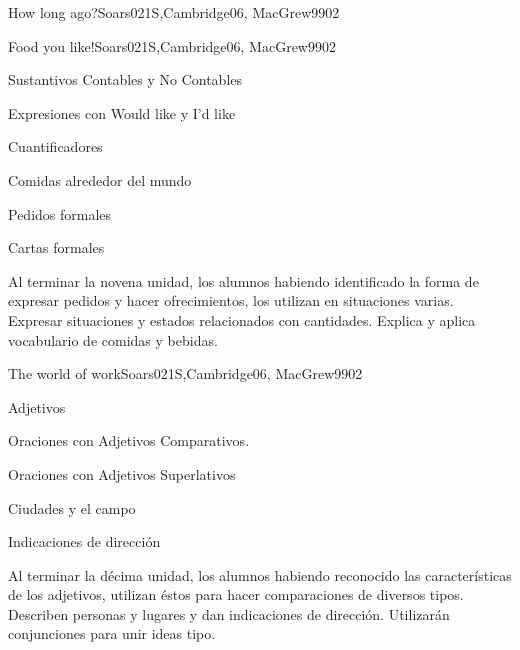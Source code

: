 \begin{syllabus}
\begin{unit}{How long ago?}{}{Soars021S,Cambridge06, MacGrew99}{0}{2}
\end{unit}
\begin{unit}{Food you like!}{}{Soars021S,Cambridge06, MacGrew99}{0}{2}
   \begin{topics}
      \item Sustantivos Contables y No Contables
      \item Expresiones con Would like y I'd like
      \item Cuantificadores
      \item Comidas alrededor del mundo
      \item Pedidos formales
      \item Cartas formales
   \end{topics}

   \begin{learningoutcomes}
      \item Al terminar la novena unidad, los alumnos habiendo identificado la forma de expresar pedidos y hacer ofrecimientos, los utilizan en situaciones varias. Expresar situaciones y estados relacionados con cantidades. Explica y aplica vocabulario de comidas y bebidas.
   \end{learningoutcomes}
\end{unit}

\begin{unit}{The world of work}{}{Soars021S,Cambridge06, MacGrew99}{0}{2}
   \begin{topics}
      \item Adjetivos
      \item Oraciones con Adjetivos Comparativos.
      \item Oraciones con Adjetivos Superlativos
      \item Ciudades y el campo
      \item Indicaciones de dirección
   \end{topics}

   \begin{learningoutcomes}
      \item Al terminar la décima unidad, los alumnos habiendo reconocido las características de los adjetivos, utilizan éstos para hacer comparaciones de diversos tipos. Describen personas y lugares y dan indicaciones de dirección. Utilizarán conjunciones para unir ideas tipo. 
   \end{learningoutcomes}

\end{unit}


\end{syllabus}
